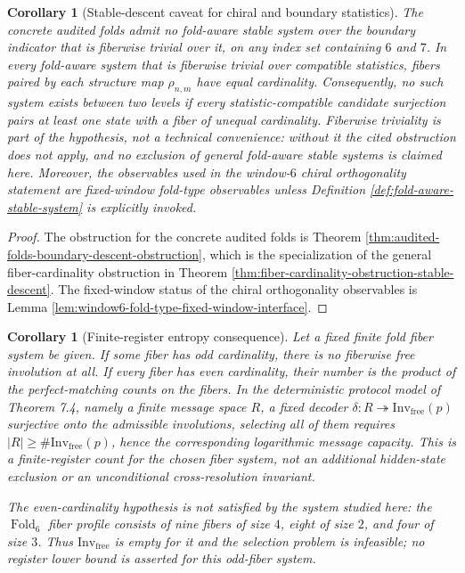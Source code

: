 \documentclass[12pt,a4paper]{article}
\theoremstyle{plain}
\newtheorem{corollary}[theorem]{Corollary}
\theoremstyle{definition}
\numberwithin{equation}{section}
\newcommand{\Fold}{\operatorname{Fold}}
\begin{document}
\begin{corollary}[Stable-descent caveat for chiral and boundary statistics]\label{cor:main-fold6-stable-descent-caveat}
The concrete audited folds admit no fold-aware stable system over the boundary indicator that is fiberwise trivial over it, on any index set containing \(6\) and \(7\).  In every fold-aware system that is fiberwise trivial over compatible statistics, fibers paired by each structure map \(\rho_{n,m}\) have equal cardinality.  Consequently, no such system exists between two levels if every statistic-compatible candidate surjection pairs at least one state with a fiber of unequal cardinality.  Fiberwise triviality is part of the hypothesis, not a technical convenience: without it the cited obstruction does not apply, and no exclusion of general fold-aware stable systems is claimed here.  Moreover, the observables used in the window-\(6\) chiral orthogonality statement are fixed-window fold-type observables unless Definition \ref{def:fold-aware-stable-system} is explicitly invoked.
\end{corollary}

\begin{proof}
The obstruction for the concrete audited folds is Theorem \ref{thm:audited-folds-boundary-descent-obstruction}, which is the specialization of the general fiber-cardinality obstruction in Theorem \ref{thm:fiber-cardinality-obstruction-stable-descent}.  The fixed-window status of the chiral orthogonality observables is Lemma \ref{lem:window6-fold-type-fixed-window-interface}. \qedhere
\end{proof}

\begin{corollary}[Finite-register entropy consequence]\label{cor:main-fold6-register-entropy-consequence}
Let a fixed finite fold fiber system be given.  If some fiber has odd cardinality, there is no fiberwise free involution at all.  If every fiber has even cardinality, their number is the product of the perfect-matching counts on the fibers.  In the deterministic protocol model of Theorem 7.4, namely a finite message space \(R\), a fixed decoder \(\delta:R\twoheadrightarrow\mathrm{Inv}_{\mathrm{free}}(p)\) surjective onto the admissible involutions, selecting all of them requires \(\lvert R\rvert\ge\#\mathrm{Inv}_{\mathrm{free}}(p)\), hence the corresponding logarithmic message capacity.  This is a finite-register count for the chosen fiber system, not an additional hidden-state exclusion or an unconditional cross-resolution invariant.

The even-cardinality hypothesis is not satisfied by the system studied here: the \(\Fold_6\) fiber profile consists of nine fibers of size \(4\), eight of size \(2\), and four of size \(3\).  Thus \(\mathrm{Inv}_{\mathrm{free}}\) is empty for it and the selection problem is infeasible; no register lower bound is asserted for this odd-fiber system.
\end{corollary}
\end{document}
